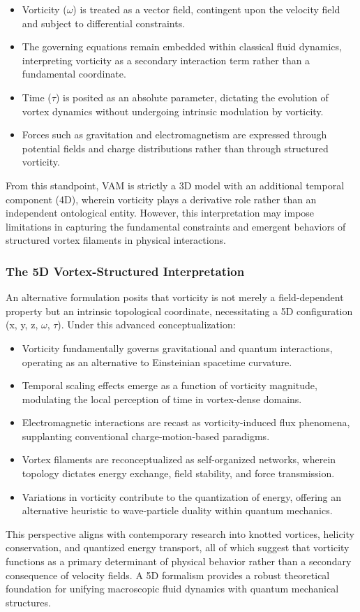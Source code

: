 \begin{itemize}
    \item Vorticity ($\omega$) is treated as a vector field, contingent upon the velocity field and subject to differential constraints.
    \item The governing equations remain embedded within classical fluid dynamics, interpreting vorticity as a secondary interaction term rather than a fundamental coordinate.
    \item Time ($\tau$) is posited as an absolute parameter, dictating the evolution of vortex dynamics without undergoing intrinsic modulation by vorticity.
    \item Forces such as gravitation and electromagnetism are expressed through potential fields and charge distributions rather than through structured vorticity.
\end{itemize}

From this standpoint, VAM is strictly a 3D model with an additional temporal component (4D), wherein vorticity plays a derivative role rather than an independent ontological entity.
However, this interpretation may impose limitations in capturing the fundamental constraints and emergent behaviors of structured vortex filaments in physical interactions.

\subsubsection*{The 5D Vortex-Structured Interpretation}
An alternative formulation posits that vorticity is not merely a field-dependent property but an intrinsic topological coordinate, necessitating a 5D configuration (x, y, z, $\omega$, $\tau$).
Under this advanced conceptualization:

\begin{itemize}
    \item Vorticity fundamentally governs gravitational and quantum interactions, operating as an alternative to Einsteinian spacetime curvature.
    \item Temporal scaling effects emerge as a function of vorticity magnitude, modulating the local perception of time in vortex-dense domains.
    \item Electromagnetic interactions are recast as vorticity-induced flux phenomena, supplanting conventional charge-motion-based paradigms.
    \item Vortex filaments are reconceptualized as self-organized networks, wherein topology dictates energy exchange, field stability, and force transmission.
    \item Variations in vorticity contribute to the quantization of energy, offering an alternative heuristic to wave-particle duality within quantum mechanics.
\end{itemize}
This perspective aligns with contemporary research into knotted vortices, helicity conservation, and quantized energy transport, all of which suggest that vorticity functions as a primary determinant of physical behavior rather than a secondary consequence of velocity fields.
A 5D formalism provides a robust theoretical foundation for unifying macroscopic fluid dynamics with quantum mechanical structures.

